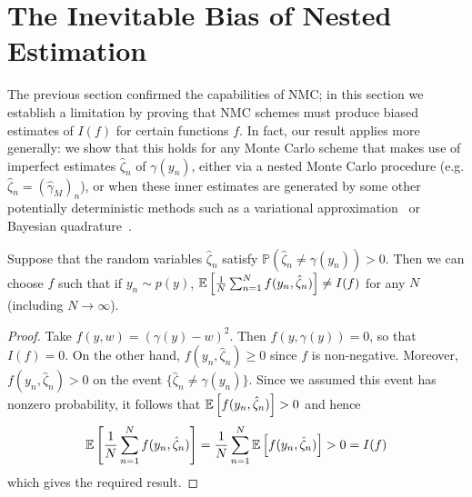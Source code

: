 
\section{The Inevitable Bias of Nested Estimation} 
\label{sec:bias}

The previous section confirmed the capabilities of NMC; in this section we establish a
limitation by proving that NMC schemes must produce biased estimates of $I(f)$ for certain
functions $f$. In fact, our result applies more generally: we show that this holds for any
Monte Carlo scheme that makes use of imperfect estimates $\hat{\zeta}_n$ of $\gamma(y_n)$,
either via a nested Monte Carlo procedure (e.g. $\hat{\zeta}_n = (\hat{\gamma}_M)_n$), or
when these inner estimates are generated by some other potentially deterministic methods
such as a variational approximation~\citep{blei2016variational} or Bayesian
quadrature~\citep{o1991bayes}.
\vspace{-5pt}
\begin{theorem}
  Suppose that the random variables $\hat{\zeta}_n$ satisfy
    $\mathbb{P}(\hat{\zeta}_n \neq \gamma(y_n)) > 0$.
  Then we can choose $f$ such that if $y_n \sim p(y)$,
    $\mathbb{E}\left[\frac{1}{N} \sum_{n=1}^N f(y_n, \hat{\zeta}_n)\right] \neq I(f)$ for any
    $N$ (including $N\rightarrow\infty$).
\end{theorem}
\vspace{-5pt}
\begin{proof}
	Take $f(y, w) = (\gamma(y) - w)^2$. Then $f(y, \gamma(y)) = 0$, so that $I(f) = 0$.  On
	the other hand, $f(y_n, \hat{\zeta}_n) \geq 0$ since $f$ is non-negative.
	Moreover, $f(y_n, \hat{\zeta}_n) > 0$ on the event $\{\hat{\zeta}_n \neq \gamma(y_n)\}$.
	Since we assumed this event has nonzero probability, it follows that $\mathbb{E} \left[f(y_n, \hat{\zeta}_n)\right] > 0$ and hence
	\[
	\mathbb{E}\left[\frac{1}{N} \sum_{n=1}^N f(y_n, \hat{\zeta}_n)\right]
	= \frac{1}{N} \sum_{n=1}^N \mathbb{E}\left[f(y_n, \hat{\zeta}_n)\right]
	> 0 = I(f)
	\]
	which gives the required result.
\end{proof}
